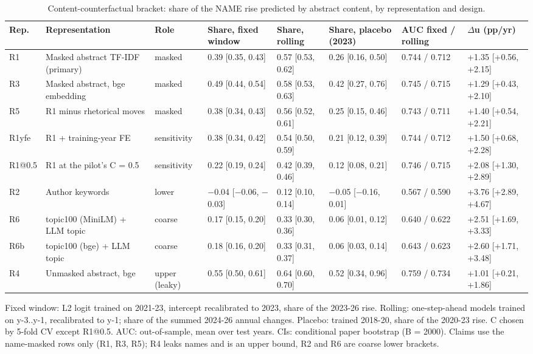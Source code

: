 \begin{landscape}
\begin{table}[p]
\centering
\scriptsize
\caption{Content-counterfactual bracket: share of the NAME rise predicted by abstract content, by representation and design.}
\label{tab:content}
\begin{adjustbox}{max width=\linewidth}
\begin{tabular}{l l l l l l l l}
\toprule
Rep. & Representation & Role & Share, fixed window & Share, rolling & Share, placebo (2023) & AUC fixed / rolling & $\Delta$u (pp/yr) \\
\midrule
R1 & Masked abstract TF-IDF (primary) & masked & 0.39 [0.35, 0.43] & 0.57 [0.53, 0.62] & 0.26 [0.16, 0.50] & 0.744 / 0.712 & +1.35 [+0.56, +2.15] \\
R3 & Masked abstract, bge embedding & masked & 0.49 [0.44, 0.54] & 0.58 [0.53, 0.63] & 0.42 [0.27, 0.76] & 0.745 / 0.715 & +1.29 [+0.43, +2.10] \\
R5 & R1 minus rhetorical moves & masked & 0.38 [0.34, 0.43] & 0.56 [0.52, 0.61] & 0.25 [0.15, 0.46] & 0.743 / 0.711 & +1.40 [+0.54, +2.21] \\
R1yfe & R1 + training-year FE & sensitivity & 0.38 [0.34, 0.42] & 0.54 [0.50, 0.59] & 0.21 [0.12, 0.39] & 0.744 / 0.712 & +1.50 [+0.68, +2.28] \\
R1@0.5 & R1 at the pilot's C = 0.5 & sensitivity & 0.22 [0.19, 0.24] & 0.42 [0.39, 0.46] & 0.12 [0.08, 0.21] & 0.746 / 0.715 & +2.08 [+1.30, +2.89] \\
R2 & Author keywords & lower & $-$0.04 [$-$0.06, $-$0.03] & 0.12 [0.10, 0.14] & $-$0.05 [$-$0.16, 0.01] & 0.567 / 0.590 & +3.76 [+2.89, +4.67] \\
R6 & topic100 (MiniLM) + LLM topic & coarse & 0.17 [0.15, 0.20] & 0.33 [0.30, 0.36] & 0.06 [0.01, 0.12] & 0.640 / 0.622 & +2.51 [+1.69, +3.33] \\
R6b & topic100 (bge) + LLM topic & coarse & 0.18 [0.16, 0.20] & 0.33 [0.31, 0.37] & 0.06 [0.03, 0.14] & 0.643 / 0.623 & +2.60 [+1.71, +3.48] \\
R4 & Unmasked abstract, bge & upper (leaky) & 0.55 [0.50, 0.61] & 0.64 [0.60, 0.70] & 0.52 [0.34, 0.96] & 0.759 / 0.734 & +1.01 [+0.21, +1.86] \\
\bottomrule
\end{tabular}
\end{adjustbox}
\par\smallskip
\parbox{\linewidth}{\scriptsize Fixed window: L2 logit trained on 2021-23, intercept recalibrated to 2023, share of the 2023-26 rise. Rolling: one-step-ahead models trained on y-3..y-1, recalibrated to y-1; share of the summed 2024-26 annual changes. Placebo: trained 2018-20, share of the 2020-23 rise. C chosen by 5-fold CV except R1@0.5. AUC: out-of-sample, mean over test years. CIs: conditional paper bootstrap (B = 2000). Claims use the name-masked rows only (R1, R3, R5); R4 leaks names and is an upper bound, R2 and R6 are coarse lower brackets.}
\end{table}
\end{landscape}
